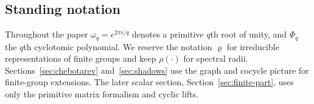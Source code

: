 \subsection{Standing notation}

Throughout the paper \(\omega_q=e^{2\pi i/q}\) denotes a primitive
\(q\)th root of unity, and \(\Phi_q\) the \(q\)th cyclotomic
polynomial. We reserve the notation \(\varrho\) for irreducible
representations of finite groups and keep \(\rho(\cdot)\) for spectral
radii. Sections~\ref{sec:chebotarev} and~\ref{sec:shadows} use the
graph and cocycle picture for finite-group extensions. The later scalar
section, Section~\ref{sec:finite-part}, uses only the primitive matrix
formalism and cyclic lifts.


